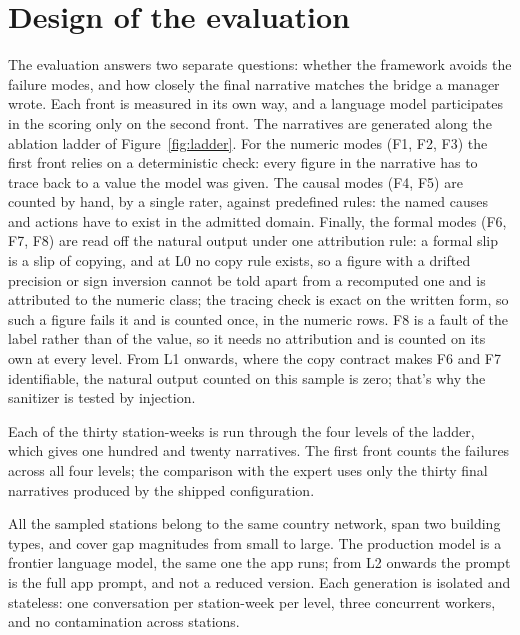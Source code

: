 \documentclass[12pt,a4paper,openright,twoside]{book}
\begin{document}

\section{Design of the evaluation}
\label{sec:eval_design}

The evaluation answers two separate questions: whether the framework avoids the failure modes, and how closely the final narrative matches the bridge a manager wrote.
Each front is measured in its own way, and a language model participates in the scoring only on the second front.
The narratives are generated along the ablation ladder of Figure~\ref{fig:ladder}.
For the numeric modes (F1, F2, F3) the first front relies on a deterministic check: every figure in the narrative has to trace back to a value the model was given.
The causal modes (F4, F5) are counted by hand, by a single rater, against predefined rules: the named causes and actions have to exist in the admitted domain.
Finally, the formal modes (F6, F7, F8) are read off the natural output under one attribution rule: a formal slip is a slip of copying, and at L0 no copy rule exists, so a figure with a drifted precision or sign inversion cannot be told apart from a recomputed one and is attributed to the numeric class; the tracing check is exact on the written form, so such a figure fails it and is counted once, in the numeric rows.
F8 is a fault of the label rather than of the value, so it needs no attribution and is counted on its own at every level.
From L1 onwards, where the copy contract makes F6 and F7 identifiable, the natural output counted on this sample is zero; that's why the sanitizer is tested by injection.

Each of the thirty station-weeks is run through the four levels of the ladder, which gives one hundred and twenty narratives. 
The first front counts the failures across all four levels; the comparison with the expert uses only the thirty final narratives produced by the shipped configuration.
 
All the sampled stations belong to the same country network, span two building types, and cover gap magnitudes from small to large.
The production model is a frontier language model, the same one the app runs; from L2 onwards the prompt is the full app prompt, and not a reduced version.
Each generation is isolated and stateless: one conversation per station-week per level, three concurrent workers, and no contamination across stations.
\end{document}
